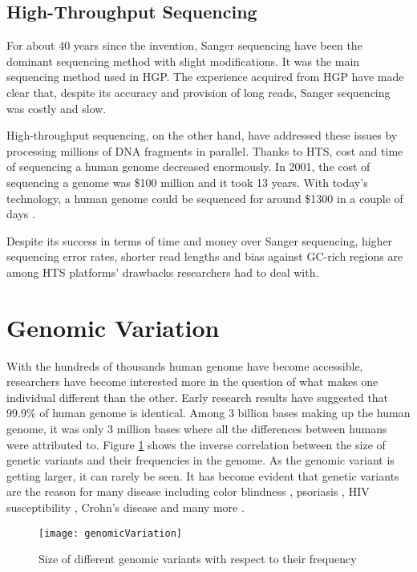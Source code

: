 \subsection{High-Throughput Sequencing}
For about 40 years since the invention, Sanger sequencing have been the dominant sequencing method with slight modifications. It was the main sequencing method used in HGP. The experience acquired from HGP have made clear that, despite its accuracy and provision of long reads, Sanger sequencing was costly and slow.

High-throughput sequencing, on the other hand, have addressed these issues by processing millions of DNA fragments in parallel. Thanks to HTS, cost and time of sequencing a human genome decreased enormously. In 2001, the cost of sequencing a genome was \$100 million and it took 13 years. With today's technology, a human genome could be sequenced for around \$1300 \cite{costOfHumanGenomeProject} in a couple of days \cite{timeEstimatesPerRun}.

Despite its success in terms of time and money over Sanger sequencing, higher sequencing error rates, shorter read lengths and bias against GC-rich regions \cite{smith2008rapid} are among HTS platforms' drawbacks researchers had to deal with. 

\section{Genomic Variation}

With the hundreds of thousands human genome have become accessible, researchers have become interested more in the question of what makes one individual different than the other. Early research results have suggested that 99.9\% of human genome is identical. Among 3 billion bases making up the human genome, it was only 3 million bases where all the differences between humans were attributed to. Figure \ref{geneticVariants} shows the inverse correlation between the size of genetic variants and their frequencies in the genome. As the genomic variant is getting larger, it can rarely be seen. It has become evident that genetic variants are the reason for many disease including color blindness \cite{colorBlindness}, psoriasis \cite{hollox2008psoriasis}, HIV susceptibility \cite{gonzalez2005influence}, Crohn's disease \cite{fellermann2006chromosome} and many more \cite{aitman2006copy}. 

\begin{figure}[ht]
\centering
\caption{Size of different genomic variants with respect to their frequency}
\texttt{[image: genomicVariation]}
\label{geneticVariants}
\end{figure}




